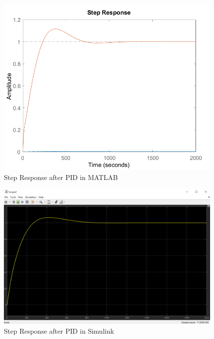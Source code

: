 \documentclass{article}
\begin{document}
\begin{figure}[h!]
	\centering
	\includegraphics[scale=0.75]{images/stepResponse_PID_MATLAB.png}
	\caption{Step Response after PID in MATLAB}
	\label{fig:stepResponse_PID_MATLAB}
\end{figure}

\begin{figure}[h!]
	\centering
	\includegraphics[scale=0.45]{images/stepResponse_PID_Simulink.png}
	\caption{Step Response after PID in Simulink}
	\label{fig:stepResponse_PID_Simulink}
\end{figure}
\end{document}
